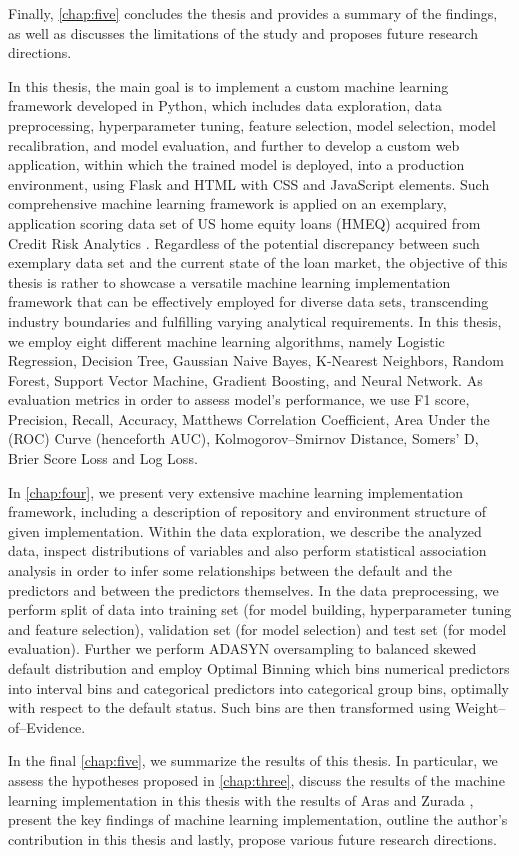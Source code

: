 Finally, \autoref{chap:five} concludes the thesis and provides a summary of the findings, as well as discusses the limitations of the study and proposes future research directions.


In this thesis, the main goal is to implement a custom machine learning framework developed in Python, which includes data exploration, data preprocessing, hyperparameter tuning, feature selection, model selection, model recalibration, and model evaluation, and further to develop a custom web application, within which the trained model is deployed, into a production environment, using Flask and HTML with CSS and JavaScript elements.
Such comprehensive machine learning framework is applied on an exemplary, application scoring data set of US home equity loans (HMEQ) acquired from Credit Risk Analytics \citep{baesens2016credit}.
Regardless of the potential discrepancy between such exemplary data set and the current state of the loan market, the objective of this thesis is rather to showcase a versatile machine learning implementation framework that can be effectively employed for diverse data sets, transcending industry boundaries and fulfilling varying analytical requirements.
In this thesis, we employ eight different machine learning algorithms, namely Logistic Regression, Decision Tree, Gaussian Naive Bayes, K-Nearest Neighbors, Random Forest, Support Vector Machine, Gradient Boosting, and Neural Network.
As evaluation metrics in order to assess model's performance, we use F1 score, Precision, Recall, Accuracy, Matthews Correlation Coefficient, Area Under the (ROC) Curve (henceforth AUC), Kolmogorov--Smirnov Distance, Somers' D, Brier Score Loss and Log Loss.



In \autoref{chap:four}, we present very extensive machine learning implementation framework, including a description of repository and environment structure of given implementation. Within the data exploration, we describe the analyzed data, inspect distributions of variables and also perform statistical association analysis in order to infer some relationships between the default and the predictors and between the predictors themselves.
In the data preprocessing, we perform split of data into training set (for model building, hyperparameter tuning and feature selection), validation set (for model selection) and test set (for model evaluation).
Further we perform ADASYN oversampling to balanced skewed default distribution and employ Optimal Binning which bins numerical predictors into interval bins and categorical predictors into categorical group bins, optimally with respect to the default status. Such bins are then transformed using Weight--of--Evidence.


In the final \autoref{chap:five}, we summarize the results of this thesis. In particular, we assess the hypotheses proposed in \autoref{chap:three}, discuss the results of the machine learning implementation in this thesis with the results of Aras \citep{serkan2021bagging} and Zurada \citep{zurada2014classification}, present the key findings of machine learning implementation, outline the author's contribution in this thesis and lastly, propose various future research directions.

